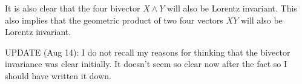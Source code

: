 It is also clear that the four bivector $X \wedge Y$ will also be Lorentz invariant.  This also implies that the geometric product of two four vectors $X Y$ will also be Lorentz invariant.

UPDATE (Aug 14): I 
do not 
recall my reasons for thinking that the bivector invariance was clear initially.  It doesn't seem so clear now after the fact so I should have written it down.
